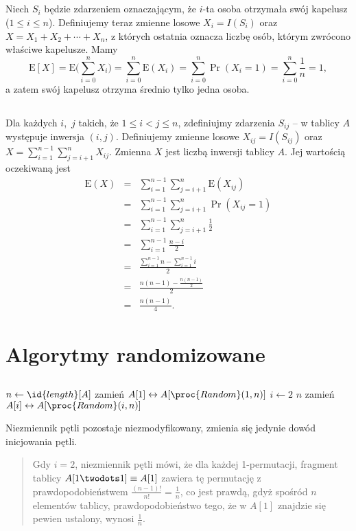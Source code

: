 \subsection{} %
Niech $S_i$ będzie zdarzeniem oznaczającym, że $i$-ta osoba otrzymała swój kapelusz ($1\le i\le n$). Definiujemy teraz zmienne losowe $X_i=I(S_i)$ oraz $X=X_1+X_2+\cdots+X_n$, z których ostatnia oznacza liczbę osób, którym zwrócono właściwe kapelusze. Mamy
\[
	\mathrm{E}[X] = \mathrm{E}\biggl(\sum_{i=0}^nX_i\biggr) = \sum_{i=0}^n\mathrm{E}(X_i) = \sum_{i=0}^n\Pr(X_i=1) = \sum_{i=0}^n\frac{1}{n} = 1,
\]
a zatem swój kapelusz otrzyma średnio tylko jedna osoba.

\subsection{} %
Dla każdych $i$,~$j$ takich, że $1\le i<j\le n$, zdefiniujmy zdarzenia $S_{ij}$ -- w tablicy $A$ występuje inwersja $(i,j)$. Definiujemy zmienne losowe $X_{ij}=I(S_{ij})$ oraz $X=\sum_{i=1}^{n-1}\sum_{j=i+1}^nX_{ij}$. Zmienna $X$ jest liczbą inwersji tablicy $A$. Jej wartością oczekiwaną jest
\begin{eqnarray*}
	\mathrm{E}(X) &=& \sum_{i=1}^{n-1}\sum_{j=i+1}^n\mathrm{E}(X_{ij}) \\
	&=& \sum_{i=1}^{n-1}\sum_{j=i+1}^n\Pr(X_{ij}=1) \\
	&=& \sum_{i=1}^{n-1}\sum_{j=i+1}^n\frac{1}{2} \\
	&=& \sum_{i=1}^{n-1}\frac{n-i}{2} \\
	&=& \frac{\sum_{i=1}^{n-1}n-\sum_{i=1}^{n-1}i}{2} \\
	&=& \frac{n(n-1)-\frac{n(n-1)}{2}}{2} \\
	&=& \frac{n(n-1)}{4}.
\end{eqnarray*}

\section{Algorytmy randomizowane}

\subsection{} %
\begin{codebox}
\li	$n\gets\id{length}[A]$
\li	zamień $A[1]\leftrightarrow A[\proc{Random}(1,n)]$
\li	\For $i\gets2$ \To $n$
\li		\Do
			zamień $A[i]\leftrightarrow A[\proc{Random}(i,n)]$
		\End
\end{codebox}
Niezmiennik pętli pozostaje niezmodyfikowany, zmienia się jedynie dowód inicjowania pętli.
\begin{quote}
	Gdy $i=2$, niezmiennik pętli mówi, że dla każdej 1-permutacji, fragment tablicy $A[1\twodots 1]\equiv A[1]$ zawiera tę permutację z prawdopodobieństwem $\frac{(n-1)!}{n!}=\frac{1}{n}$, co jest prawdą, gdyż spośród $n$ elementów tablicy, prawdopodobieństwo tego, że w $A[1]$ znajdzie się pewien ustalony, wynosi $\frac{1}{n}$.
\end{quote}


